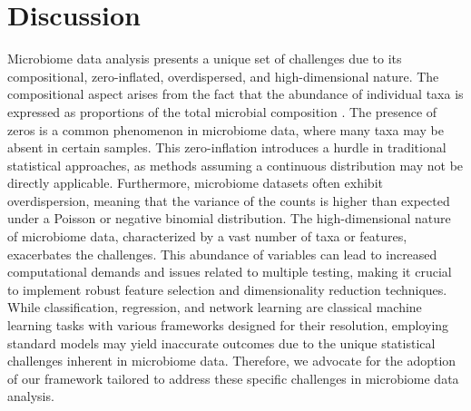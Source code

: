 \documentclass[10pt,a4paper]{article}
\let\cite\citep
\begin{document}

\section*{Discussion} %


Microbiome data analysis presents a unique set of challenges due to its compositional, zero-inflated, overdispersed, and high-dimensional nature.
The compositional aspect arises from the fact that the abundance of individual taxa is expressed as proportions of the total microbial composition \cite{gloor2017microbiome}. The presence of zeros is a common phenomenon in microbiome data, where many taxa may be absent in certain samples. This zero-inflation introduces a hurdle in traditional statistical approaches, as methods assuming a continuous distribution may not be directly applicable. Furthermore, microbiome datasets often exhibit overdispersion, meaning that the variance of the counts is higher than expected under a Poisson or negative binomial distribution. The high-dimensional nature of microbiome data, characterized by a vast number of taxa or features, exacerbates the challenges. This abundance of variables can lead to increased computational demands and issues related to multiple testing, making it crucial to implement robust feature selection and dimensionality reduction techniques. While classification, regression, and network learning are classical machine learning tasks with various frameworks designed for their resolution, employing standard models may yield inaccurate outcomes due to the unique statistical challenges inherent in microbiome data. Therefore, we advocate for the adoption of our framework tailored to address these specific challenges in microbiome data analysis.
\end{document}
